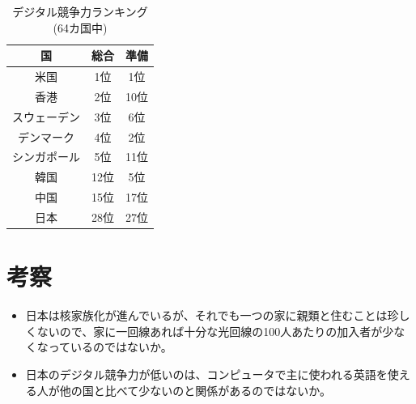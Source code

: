 \documentclass[a4paper,11pt,dvipdfmx]{ujarticle}
\begin{document}

\begin{table}[htbp]
        \centering
        \caption{デジタル競争力ランキング(64カ国中)}
        \label{tbl:デジタル}
        \begin{tabular}{|c|c|c|}
            \hline
            国 & 総合 & 準備 \\
            \hline
            米国 & 1位 & 1位 \\
            \hline
            香港 & 2位 & 10位 \\
            \hline
            スウェーデン & 3位 & 6位 \\
            \hline
            デンマーク & 4位 & 2位 \\
            \hline
            シンガポール & 5位 & 11位 \\
            \hline
            \hline
            韓国 & 12位 & 5位 \\
            \hline
            中国 & 15位 & 17位 \\
            \hline
            \hline
            日本 & 28位 & 27位 \\
            \hline
        \end{tabular}
\end{table}



\section{考察}
\begin{itemize}
    \item 日本は核家族化が進んでいるが、それでも一つの家に親類と住むことは珍しくないので、家に一回線あれば十分な光回線の100人あたりの加入者が少なくなっているのではないか。
    \item 日本のデジタル競争力が低いのは、コンピュータで主に使われる英語を使える人が他の国と比べて少ないのと関係があるのではないか。
\end{itemize}

%

%


\end{document}
